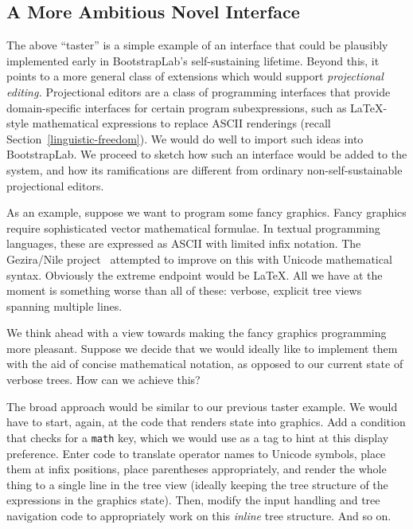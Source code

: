 \documentclass[ twoside,openright,titlepage,numbers=noenddot,headinclude,footinclude,cleardoublepage=empty,abstract=on,
                BCOR=5mm,paper=a4,fontsize=11pt
                ]{scrreprt}
\theoremstyle{definition}
\begin{document}
\hypertarget{a-more-ambitious-novel-interface}{\subsection{A More Ambitious Novel
Interface}\label{a-more-ambitious-novel-interface}}

The above ``taster'' is a simple example of an interface that could be
plausibly implemented early in BootstrapLab's self-sustaining lifetime.
Beyond this, it points to a more general class of extensions which would
support \emph{projectional editing.} Projectional editors are a class of
programming interfaces that provide domain-specific interfaces for
certain program subexpressions, such as \LaTeX-style mathematical
expressions to replace ASCII renderings (recall
Section~\ref{linguistic-freedom}). We would do well to import such ideas
into BootstrapLab. We proceed to sketch how such an interface would be
added to the system, and how its ramifications are different from
ordinary non-self-sustainable projectional editors.

As an example, suppose we want to program some fancy graphics. Fancy
graphics require sophisticated vector mathematical formulae. In textual
programming languages, these are expressed as ASCII with limited infix
notation. The Gezira/Nile project~\parencite{Gezira,Nile} attempted to
improve on this with Unicode mathematical syntax. Obviously the extreme
endpoint would be \LaTeX. All we have at the moment is something worse
than all of these: verbose, explicit tree views spanning multiple lines.

We think ahead with a view towards making the fancy graphics programming
more pleasant. Suppose we decide that we would ideally like to implement
them with the aid of concise mathematical notation, as opposed to our
current state of verbose trees. How can we achieve this?

The broad approach would be similar to our previous taster example. We
would have to start, again, at the code that renders state into
graphics. Add a condition that checks for a \texttt{math} key, which we
would use as a tag to hint at this display preference. Enter code to
translate operator names to Unicode symbols, place them at infix
positions, place parentheses appropriately, and render the whole thing
to a single line in the tree view (ideally keeping the tree structure of
the expressions in the graphics state). Then, modify the input handling
and tree navigation code to appropriately work on this \emph{inline}
tree structure. And so on.
\end{document}
